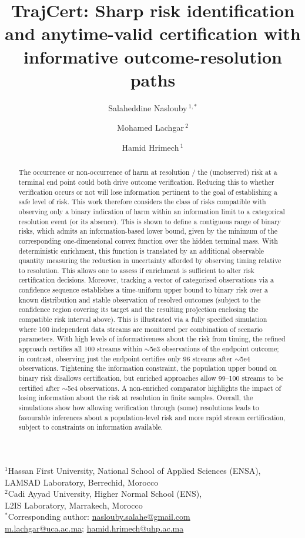 \documentclass[11pt]{article}
\title{TrajCert: Sharp risk identification and anytime-valid certification with informative outcome-resolution paths}
\author{Salaheddine Naslouby\,\orcidlink{0009-0002-7295-7816}$^{1,*}$ \and Mohamed Lachgar\,\orcidlink{0000-0002-6155-3309}$^2$ \and Hamid Hrimech\,\orcidlink{0000-0002-3980-1214}$^1$}
\date{}
\theoremstyle{definition}
\theoremstyle{remark}
\begin{document}
\maketitle
\begin{center}\small
$^1$Hassan First University, National School of Applied Sciences (ENSA),\\
LAMSAD Laboratory, Berrechid, Morocco\\[3pt]
$^2$Cadi Ayyad University, Higher Normal School (ENS),\\
L2IS Laboratory, Marrakech, Morocco\\[5pt]
$^*$Corresponding author: \href{mailto:naslouby.salahe@gmail.com}{naslouby.salahe@gmail.com}\\
\href{mailto:m.lachgar@uca.ac.ma}{m.lachgar@uca.ac.ma};
\href{mailto:hamid.hrimech@uhp.ac.ma}{hamid.hrimech@uhp.ac.ma}
\end{center}
\begin{abstract}
The occurrence or non-occurrence of harm at resolution / the (unobserved) risk at a terminal end point could both drive outcome verification. Reducing this to whether verification occurs or not will lose information pertinent to the goal of establishing a safe level of risk. This work therefore considers the class of risks compatible with observing only a binary indication of harm within an information limit to a categorical resolution event (or its absence). This is shown to define a contiguous range of binary risks, which admits an information-based lower bound, given by the minimum of the corresponding one-dimensional convex function over the hidden terminal mass. With deterministic enrichment, this function is translated by an additional observable quantity measuring the reduction in uncertainty afforded by observing timing relative to resolution. This allows one to assess if enrichment is sufficient to alter risk certification decisions. Moreover, tracking a vector of categorised observations via a confidence sequence establishes a time-uniform upper bound to binary risk over a known distribution and stable observation of resolved outcomes (subject to the confidence region covering its target and the resulting projection enclosing the compatible risk interval above). This is illustrated via a fully specified simulation where 100 independent data streams are monitored per combination of scenario parameters. With high levels of informativeness about the risk from timing, the refined approach certifies all 100 streams within $\sim$5e3 observations of the endpoint outcome; in contrast, observing just the endpoint certifies only 96 streams after $\sim$5e4 observations. Tightening the information constraint, the population upper bound on binary risk disallows certification, but enriched approaches allow 99--100 streams to be certified after $\sim$5e4 observations. A non-enriched comparator highlights the impact of losing information about the risk at resolution in finite samples. Overall, the simulations show how allowing verification through (some) resolutions leads to favourable inferences about a population-level risk and more rapid stream certification, subject to constraints on information available.
\end{abstract}
\end{document}
